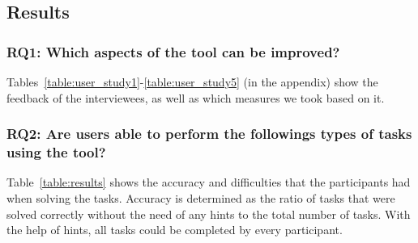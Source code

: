 \subsection{Results}\label{subsec:results}


\subsubsection{\textbf{RQ1:} Which aspects of the tool can be improved?} %
Tables~\ref{table:user_study1}-\ref{table:user_study5} (in the appendix) show the feedback of the interviewees, as well as which measures we took based on it.



\subsubsection{\textbf{RQ2:} Are users able to perform the followings types of tasks using the tool?}
Table~\ref{table:results} shows the accuracy and difficulties that the participants had when solving the tasks.
Accuracy is determined as the ratio of tasks that were solved correctly without the need of any hints to the total number of tasks.
With the help of hints, all tasks could be completed by every participant.

